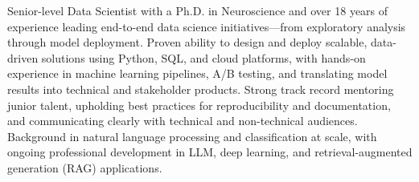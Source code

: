 

\begin{cvparagraph}


 Senior-level Data Scientist with a Ph.D. in Neuroscience and over 18 years of experience leading end-to-end data science initiatives—from exploratory analysis through model deployment. Proven ability to design and deploy scalable, data-driven solutions using Python, SQL, and cloud platforms, with hands-on experience in machine learning pipelines, A/B testing, and translating model results into technical and stakeholder products. Strong track record mentoring junior talent, upholding best practices for reproducibility and documentation, and communicating clearly with technical and non-technical audiences. Background in natural language processing and classification at scale, with ongoing professional development in LLM, deep learning, and retrieval-augmented generation (RAG) applications.

\end{cvparagraph}
